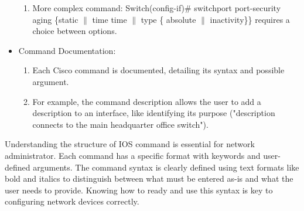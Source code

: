 \documentclass[a4paper,11pt]{article}
\begin{document}
\begin{itemize}
\begin{enumerate}
        \item More complex command: Switch(config-if)\# switchport port-security aging \{static $\|$ time time $ \|$ type \{ absolute $\|$ inactivity\}\} requires a choice between options.\\
    \end{enumerate}
    \item Command Documentation:\\
    \begin{enumerate}
        \item Each Cisco command is documented, detailing its syntax and possible argument.\\
        \item For example, the command description  allows the user to add a description to an interface, like identifying its purpose ("description connects to the main headquarter office switch").\\
    \end{enumerate}
\end{itemize}
\begin{tcolorbox}[colframe=blue!80, colback=blue!20, coltitle=black, title= Scenario: General Idea:]
Understanding the structure of IOS command is essential for network administrator. Each command has a specific format with keywords and user-defined arguments. The command syntax is clearly defined using text formats like bold and italics to distinguish between what must be entered as-is and what the user needs to provide. Knowing how to ready and use this syntax is key to configuring network devices correctly.\\  
\end{tcolorbox}
\end{document}
